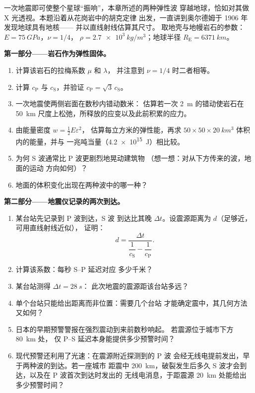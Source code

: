 \begin{problem}\label{pb:b3:continuum-elasticity:1}
一次地震即可使整个星球“振响”，本章所述的两种弹性波
穿越地球，恰如对其做 X 光透视。本题沿着从花岗岩中的胡克定律
出发，一直讲到奥尔德姆于 1906 年发现地球具有地核——
并以直线射线估算其尺寸。
取地壳与地幔岩石的参数：$E = \qty{75}{GPa}$，$\nu = 1/4$，
$\rho = \qty{2.7e3}{kg/m^3}$；地球半径 $R_{\text{E}} =
\qty{6371}{km}$。

\medskip\noindent\textbf{第一部分——岩石作为弹性固体。}
\begin{enumerate}
  \item 计算该岩石的拉梅系数 $\mu$ 和 $\lambda$，
        并注意到 $\nu = 1/4$ 时二者相等。
  \item 计算 $c_{\text{P}}$ 与 $c_{\text{S}}$，并验证
        $c_{\text{P}} = \sqrt3\,c_{\text{S}}$。
  \item 一次地震使两侧岩面在数秒内错动数米：
        估算若一次 \qty{2}{m} 的错动使岩石在
        \qty{50}{km} 尺度上松弛，所释放的应变以及此前积累的应力。
  \item 由能量密度 $w = \tfrac12 E\varepsilon^2$，
        估算每立方米的弹性能，再求
        $50 \times 50 \times \qty{20}{km^3}$ 体积内的能量，并与
        一兆吨当量（\qty{4.2e15}{J}）相比较。
  \item 为何 S 波通常比 P 波更剧烈地晃动建筑物
        （想一想：对从下方传来的波，地面的运动
        方向如何）？
  \item 地面的体积变化出现在两种波中的哪一种？
\end{enumerate}

\medskip\noindent\textbf{第二部分——地震仪记录的两次到达。}
\begin{enumerate}[resume]
  \item 某台站先记录到 P 波到达，S 波
        到达比其晚 $\Delta t$。设震源距离为 $d$（足够近，可用直线射线近似），
        证明：
        \[
        d = \frac{\Delta t}{\dfrac{1}{c_{\text{S}}} -
        \dfrac{1}{c_{\text{P}}}} .
        \]
  \item 计算该系数：每秒 S--P 延迟对应
        多少千米？
  \item 某台站测得 $\Delta t = \qty{28}{s}$：
        此次地震的震源距该台站多远？
  \item 单个台站只能给出距离而非位置：需要几个台站
        才能确定震中，其几何方法又如何？
  \item 日本的早期预警警报在强烈震动到来前数秒响起。
        若震源位于城市下方 \qty{80}{km} 处，
        仅 P--S 延迟本身能提供多少预警时间？
  \item 现代预警还利用了光速：在震源附近探测到的 P 波
        会经无线电提前发出，早于两种波的到达。若一座城市
        距震中 \qty{200}{km}，破裂发生后多久
        S 波才会到达，以及在 P 波首次到达时发出的
        无线电消息，于距震源 \qty{20}{km} 处能给出
        多少预警时间？
\end{enumerate}


\end{problem}
